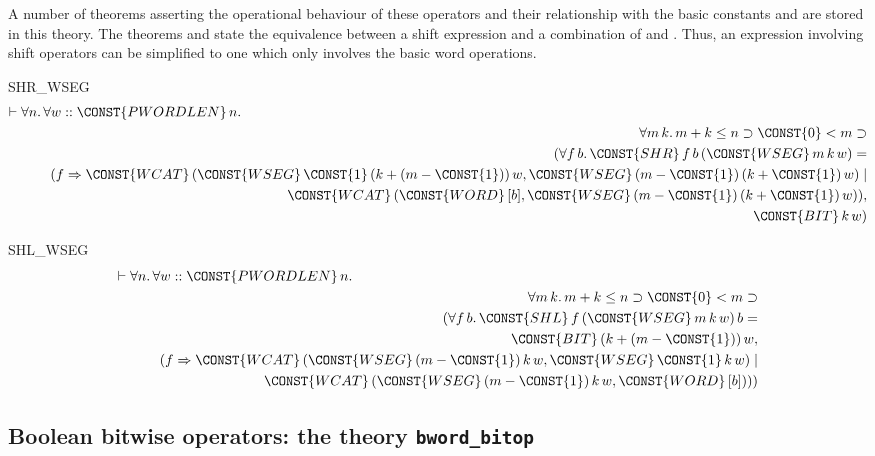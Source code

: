 A number of theorems asserting the operational behaviour of
these operators and their relationship with the basic constants
 and  are stored in this theory. The theorems
 and  state the equivalence between a
shift expression and a combination of  and .
Thus, an expression involving shift operators can be simplified to one
which only involves the basic word operations.
\begin{holthm}{SHR_WSEG}
\begin{eqnarray*}
\lefteqn{\THM \FORALL n\DOT \FORALL w ::\CONST{PWORDLEN} \,n\DOT} \\
 & & {}\FORALL m \,k\DOT
                     m + k \LEE  n \IMP \CONST{0} \LES  m \IMP \\
 & & \quad (\FORALL f \,b \DOT\CONST{SHR} \,f \,b \,(\CONST{WSEG} \,m \,k \,w) =\\
 & & \qquad (f \Rightarrow 
        \CONST{WCAT} \,(\CONST{WSEG} \,\CONST{1} \,(k + (m - \CONST{1})) \,w,
                        \CONST{WSEG} \,(m - \CONST{1}) \,(k + \CONST{1}) \,w) \mid \\
 & & \qquad \qquad \CONST{WCAT} \,(\CONST{WORD} \,[b], \CONST{WSEG} \,(m - \CONST{1}) \,(k + \CONST{1}) \,w)),\\
 & & \qquad \CONST{BIT} \,k \,w)
\end{eqnarray*}
\end{holthm}
\begin{holthm}{SHL_WSEG}
\begin{eqnarray*}
\lefteqn{\THM \FORALL n\DOT \FORALL w :: \CONST{PWORDLEN} \,n\DOT}\\
 & & {}\FORALL m \,k\DOT
        m + k \LEE  n \IMP \CONST{0} \LES  m \IMP \\
 & & \quad (\FORALL f \,b \DOT\CONST{SHL} \,f \,(\CONST{WSEG} \,m \,k \,w) \,b = \\
 & & \qquad \CONST{BIT} \,(k + (m - \CONST{1})) \,w,\\
 & & \qquad (f \Rightarrow 
        \CONST{WCAT} \,(\CONST{WSEG} \,(m - \CONST{1}) \,k \,w,
                        \CONST{WSEG} \,\CONST{1} \,k \,w) \mid \\
 & & \qquad \qquad \CONST{WCAT} \,(\CONST{WSEG} \,(m - \CONST{1}) \,k \,w,
                                       \CONST{WORD} \,[b])))
\end{eqnarray*}
\end{holthm}

\subsection{Boolean bitwise operators: the theory {\tt bword\_bitop}}

